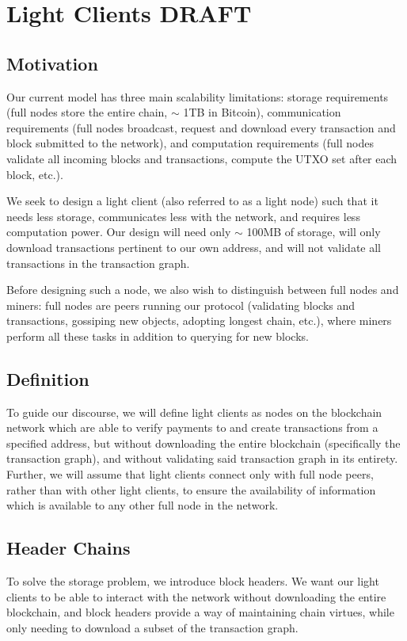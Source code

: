 \chapter{Light Clients \small{\textsf{DRAFT}}}\label{chapter.light}


\section{Motivation}
Our current model has three main scalability limitations: storage requirements (full nodes store the entire chain, $\sim$ 1TB in Bitcoin), communication requirements (full nodes broadcast, request and download every transaction and block submitted to the network), and computation requirements (full nodes validate all incoming blocks and transactions, compute the UTXO set after each block, etc.).

We seek to design a light client (also referred to as a light node) such that it needs less storage, communicates less with the network, and requires less computation power. Our design will need only $\sim$ 100MB of storage, will only download transactions pertinent to our own address, and will not validate all transactions in the transaction graph.

Before designing such a node, we also wish to distinguish between full nodes and miners: full nodes are peers running our protocol (validating blocks and transactions, gossiping new objects, adopting longest chain, etc.), where miners perform all these tasks in addition to querying for new blocks.

\section{Definition}
To guide our discourse, we will define light clients as nodes on the blockchain network which are able to verify payments to and create transactions from a specified address, but without downloading the entire blockchain (specifically the transaction graph), and without validating said transaction graph in its entirety. Further, we will assume that light clients connect only with full node peers, rather than with other light clients, to ensure the availability of information which is available to any other full node in the network.

\section{Header Chains}
To solve the storage problem, we introduce block headers. We want our light clients to be able to interact with the network without downloading the entire blockchain, and block headers provide a way of maintaining chain virtues, while only needing to download a subset of the transaction graph.

